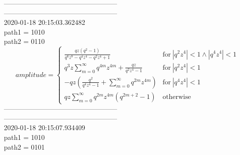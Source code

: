 \documentclass{jsreport}
\begin{document}
--------------------------------------------------\\
--------------------------------------------------\\
2020-01-18 20:15:03.362482\\
path1 = 1010\\
path2 = 0110\\
$$amplitude = \begin{cases} \frac{q z \left(q^{2} - 1\right)}{q^{6} z^{8} - q^{4} z^{4} - q^{2} z^{4} + 1} & \text{for}\: \left|{q^{2} z^{4}}\right| < 1 \wedge \left|{q^{4} z^{4}}\right| < 1 \\q^{3} z \sum_{m=0}^{\infty} q^{4 m} z^{4 m} + \frac{q z}{q^{2} z^{4} - 1} & \text{for}\: \left|{q^{2} z^{4}}\right| < 1 \\- q z \left(\frac{q^{2}}{q^{4} z^{4} - 1} + \sum_{m=0}^{\infty} q^{2 m} z^{4 m}\right) & \text{for}\: \left|{q^{4} z^{4}}\right| < 1 \\q z \sum_{m=0}^{\infty} q^{2 m} z^{4 m} \left(q^{2 m + 2} - 1\right) & \text{otherwise} \end{cases}$$
--------------------------------------------------\\
--------------------------------------------------\\
2020-01-18 20:15:07.934409\\
path1 = 1010\\
path2 = 0101\\
\end{document}
